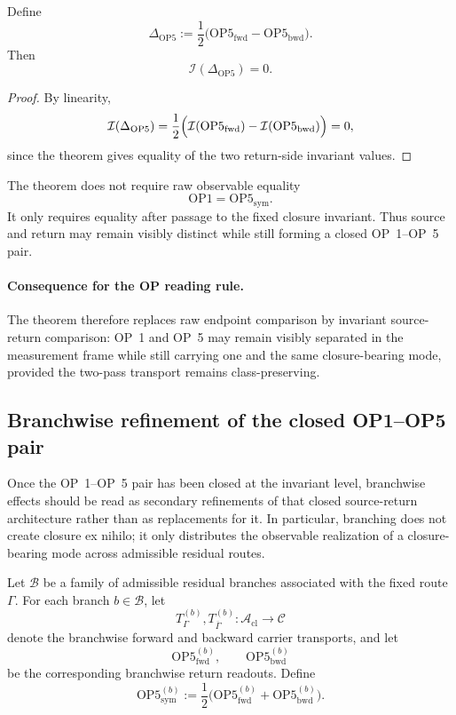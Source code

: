 \begin{corollary}
Define
\[
\Delta_{\mathrm{OP5}}
:=
\frac12\bigl(\mathrm{OP5}_{\mathrm{fwd}}-\mathrm{OP5}_{\mathrm{bwd}}\bigr).
\]
Then
\[
\mathcal{I}(\Delta_{\mathrm{OP5}})=0.
\]
\end{corollary}

\begin{proof}
By linearity,
\[
\mathcal{I}(\Delta_{\mathrm{OP5}})
=
\frac12\Bigl(
\mathcal{I}(\mathrm{OP5}_{\mathrm{fwd}})
-
\mathcal{I}(\mathrm{OP5}_{\mathrm{bwd}})
\Bigr)=0,
\]
since the theorem gives equality of the two return-side invariant values.
\end{proof}

\begin{remark}
The theorem does not require raw observable equality
\[
\mathrm{OP1}=\mathrm{OP5}_{\mathrm{sym}}.
\]
It only requires equality after passage to the fixed closure invariant. Thus source and return may remain visibly distinct while still forming a closed OP~1--OP~5 pair.
\end{remark}

\paragraph{Consequence for the OP reading rule.}
The theorem therefore replaces raw endpoint comparison by invariant source-return comparison: OP~1 and OP~5 may remain visibly separated in the measurement frame while still carrying one and the same closure-bearing mode, provided the two-pass transport remains class-preserving.

\subsection{Branchwise refinement of the closed OP1--OP5 pair}

Once the OP~1--OP~5 pair has been closed at the invariant level, branchwise effects should be read as secondary refinements of that closed source-return architecture rather than as replacements for it. In particular, branching does not create closure ex nihilo; it only distributes the observable realization of a closure-bearing mode across admissible residual routes.

Let $\mathcal{B}$ be a family of admissible residual branches associated with the fixed route $\Gamma$. For each branch $b\in\mathcal{B}$, let
\[
T_{\Gamma}^{(b)},T_{\overline{\Gamma}}^{(b)}:\mathcal{A}_{\mathrm{cl}}\to\mathcal{C}
\]
denote the branchwise forward and backward carrier transports, and let
\[
\mathrm{OP5}^{(b)}_{\mathrm{fwd}},
\qquad
\mathrm{OP5}^{(b)}_{\mathrm{bwd}}
\]
be the corresponding branchwise return readouts. Define
\[
\mathrm{OP5}^{(b)}_{\mathrm{sym}}
:=
\frac12\bigl(\mathrm{OP5}^{(b)}_{\mathrm{fwd}}+\mathrm{OP5}^{(b)}_{\mathrm{bwd}}\bigr).
\]

